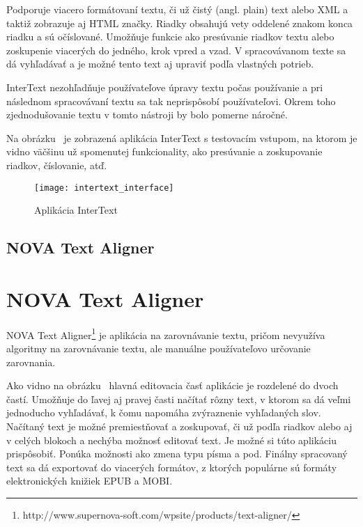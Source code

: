 Podporuje viacero formátovaní textu, či už čistý (angl. plain) text alebo XML a taktiž zobrazuje aj HTML značky. Riadky obsahujú vety oddelené znakom konca riadku a sú očíslované. Umožňuje funkcie ako presúvanie riadkov textu alebo zoskupenie viacerých do jedného, krok vpred a vzad. V spracovávanom texte sa dá vyhľadávať a je možné tento text aj upraviť podľa vlastných potrieb.

InterText nezohľadňuje používateľove úpravy textu počas používanie a pri následnom spracovávaní textu sa tak neprispôsobí používateľovi. Okrem toho zjednodušovanie textu v tomto nástroji by bolo pomerne náročné.

Na obrázku~ je zobrazená aplikácia InterText s testovacím vstupom, na ktorom je vidno väčšinu už spomenutej funkcionality, ako presúvanie a zoskupovanie riadkov, číslovanie, atď.

\begin{figure}[H]
	\begin{center}\texttt{[image: intertext\_interface]}\end{center}
	\caption[Aplikácia InterText]{Aplikácia InterText}\label{fig:intertext_interface}
\end{figure}

%
%
{
	\subsection{NOVA Text Aligner}
}
{
	\section{NOVA Text Aligner}
}
NOVA Text Aligner\footnote{http://www.supernova-soft.com/wpsite/products/text-aligner/} je aplikácia na zarovnávanie textu, pričom nevyužíva algoritmy na zarovnávanie textu, ale manuálne používateľovo určovanie zarovnania.

Ako vidno na obrázku~ hlavná editovacia časť aplikácie je rozdelené do dvoch častí. Umožňuje do ľavej aj pravej časti načítať rôzny text, v ktorom sa dá veľmi jednoducho vyhľadávať, k čomu napomáha zvýraznenie vyhľadaných slov. Načítaný text je možné premiestňovať a zoskupovať, či už podľa riadkov alebo aj v celých blokoch a nechýba možnosť editovať text. Je možné si túto aplikáciu prispôsobiť. Ponúka možnosti ako zmena typu písma a pod. Finálny spracovaný text sa dá exportovať do viacerých formátov, z ktorých populárne sú formáty elektronických knižiek EPUB a MOBI.

